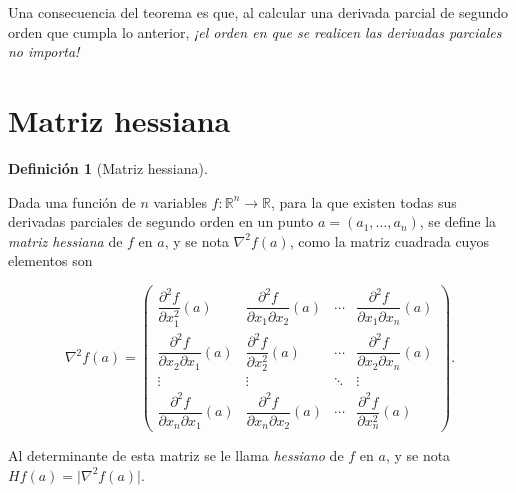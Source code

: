 \documentclass[
  a4paper,
]{scrreport}
\theoremstyle{definition}
\theoremstyle{definition}
\theoremstyle{definition}
\newtheorem{definition}{Definición}[chapter]
\theoremstyle{plain}
\theoremstyle{plain}
\theoremstyle{plain}
\theoremstyle{remark}
\begin{document}
Una consecuencia del teorema es que, al calcular una derivada parcial de
segundo orden que cumpla lo anterior, \emph{¡el orden en que se realicen
las derivadas parciales no importa!}

\section{Matriz hessiana}\label{matriz-hessiana}

\begin{definition}[Matriz
hessiana]\protect\hypertarget{def-matriz-hessiana}{}\label{def-matriz-hessiana}

Dada una función de \(n\) variables
\(f:\mathbb{R}^n\rightarrow \mathbb{R}\), para la que existen todas sus
derivadas parciales de segundo orden en un punto \(a=(a_1,\ldots,a_n)\),
se define la \emph{matriz hessiana} de \(f\) en \(a\), y se nota
\(\nabla^2f(a)\), como la matriz cuadrada cuyos elementos son

\[\nabla^2f(a)=\left(
\begin{array}{cccc}
\dfrac{\partial^2 f}{\partial x_1^2}(a) &
\dfrac{\partial^2 f}{\partial x_1 \partial x_2}(a) &
\cdots &
\dfrac{\partial^2 f}{\partial x_1 \partial x_n}(a)\\
\dfrac{\partial^2 f}{\partial x_2 \partial x_1}(a) &
\dfrac{\partial^2 f}{\partial x_2^2}(a) &
\cdots &
\dfrac{\partial^2 f}{\partial x_2 \partial x_n}(a)\\
\vdots & \vdots & \ddots & \vdots \\
\dfrac{\partial^2 f}{\partial x_n \partial x_1}(a) &
\dfrac{\partial^2 f}{\partial x_n \partial x_2}(a) &
\cdots &
\dfrac{\partial^2 f}{\partial x_n^2}(a)
\end{array}
\right).\]

Al determinante de esta matriz se le llama \emph{hessiano} de \(f\) en
\(a\), y se nota \(Hf(a)=\lvert \nabla^2f(a)\rvert\).

\end{definition}
\end{document}
